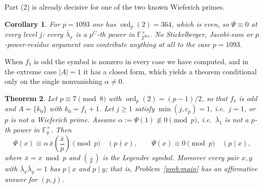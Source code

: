 \documentclass[a4paper]{article}
\newtheorem{theorem}{Theorem}[section]
\newtheorem{corollary}[theorem]{Corollary}
\newcommand{\F}{\mathbb{F}}
\newcommand{\ord}[2][]{\operatorname{ord}_{#1}\!\left(#2\right)}
\newcommand{\abs}[1]{\left|#1\right|}
\begin{document}
Part (2) is already decisive for one of the two known Wieferich primes.

\begin{corollary}\label{cor:1093-ppart}
	For $p=1093$ one has $\ord[p]{2}=364$, which is even, so
	$\Psi\equiv0$ at every level $j$: every $\bar\lambda_x$ is a
	$p^{C}$-th power in $\F_{2^{364}}^{\times}$.
	No Stickelberger, Jacobi-sum or $p$-power-residue argument can
	contribute anything at all to the case $p=1093$.
\end{corollary}

When $f_1$ is odd the symbol is nonzero in every case we have computed, and
in the extreme case $\abs{A}=1$ it has a closed form, which yields a
theorem conditional only on the single nonvanishing $\alpha\ne0$.

\begin{theorem}\label{thm:qr}
	Let $p\equiv7\pmod 8$ with $\ord[p]{2}=(p-1)/2$, so that $f_1$ is odd
	and $A=\{k_0\}$ with $k_0=f_1+1$.
	Let $j\geq1$ satisfy $\min(j,c_p)=1$, i.e.\ $j=1$, or $p$ is not a
	Wieferich prime.
	Assume $\alpha:=\Psi(1)\not\equiv0\pmod p$, i.e.\ $\bar\lambda_1$ is
	not a $p$-th power in $\F_q^{\times}$.
	Then
	\[
		\Psi(x)\equiv\alpha\,\bar x\left(\frac{\bar x}{p}\right)\pmod p
		\quad(p\nmid x),
		\qquad
		\Psi(x)\equiv0\pmod p\quad(p\mid x),
	\]
	where $\bar x=x\bmod p$ and $\left(\frac\cdot p\right)$ is the Legendre
	symbol.  Moreover every pair $x,y$ with
	$\bar\lambda_x\bar\lambda_y=1$ has $p\mid x$ and $p\mid y$; that is,
	Problem~\ref{prob:main} has an affirmative answer for $(p,j)$.
\end{theorem}
\end{document}
